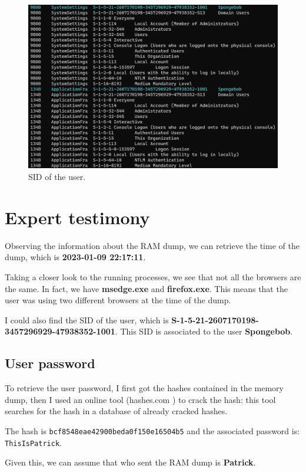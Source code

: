 \documentclass[12pt]{article}
\begin{document}
\begin{figure}
        \centering
        \includegraphics[width=\textwidth]{images/sids.png}
        \caption{SID of the user.}
        \label{fig:sid}
\end{figure}

\section{Expert testimony}

Observing the information about the RAM dump, we can retrieve the time of the dump, which is \textbf{2023-01-09 22:17:11}.

Taking a closer look to the running processes, we see that not all the browsers are the same. In fact, we have \textbf{msedge.exe} and \textbf{firefox.exe}. This means that the user was using two different browsers at the time of the dump.

I could also find the SID of the user, which is \textbf{S-1-5-21-2607170198-3457296929-47938352-1001}. This SID is associated to the user \textbf{Spongebob}.

\subsection{User password}

To retrieve the user password, I first got the hashes contained in the memory dump, then I used an online tool (hashes.com \cite{hashes}) to crack the hash: this tool searches for the hash in a database of already cracked hashes.

The hash is \texttt{bcf8548eae42900beda0f150e16504b5} and the associated password is: \\\texttt{ThisIsPatrick}.

Given this, we can assume that who sent the RAM dump is \textbf{Patrick}.

\printbibliography[title={References}]
\end{document}
